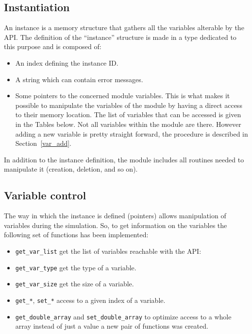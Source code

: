 \subsection{Instantiation}\label{subsec:instan}
An instance is a memory structure that gathers all the variables alterable
by the API\@. The definition of the ``instance'' structure is made in a
\fortran{} type dedicated to this purpose and is composed of:

\begin{itemize}
\item An index defining the instance ID\@.
\item A string which can contain error messages.
\item Some pointers to the concerned module variables. This is what makes it
  possible to manipulate the variables of the module by having a direct access
    to their memory location. The list of variables that can be accessed is
    given in the Tables below. Not all
    variables within the module are there. However adding a new variable is
    pretty straight forward, the procedure is described in
    Section~\ref{var_add}.
\end{itemize}






In addition to the instance definition, the module includes all routines needed
to manipulate it (creation, deletion, and so on).

\subsection{Variable control}
\label{subsec:var}
The way in which the instance is defined (pointers) allows manipulation of
variables during the simulation. So, to get information on the variables the
following set of functions has been implemented:

\begin{itemize}

\item \verb!get_var_list! get the list of variables reachable with the API:

\item \verb!get_var_type! get the type of a variable.

\item \verb!get_var_size! get the size of a variable.

\item \verb!get_*!, \verb!set_*! access to a given index of a
  variable.

\item \verb!get_double_array! and \verb!set_double_array! to optimize
  access to a whole array instead of just a value a new pair of
functions was created.

\end{itemize}


